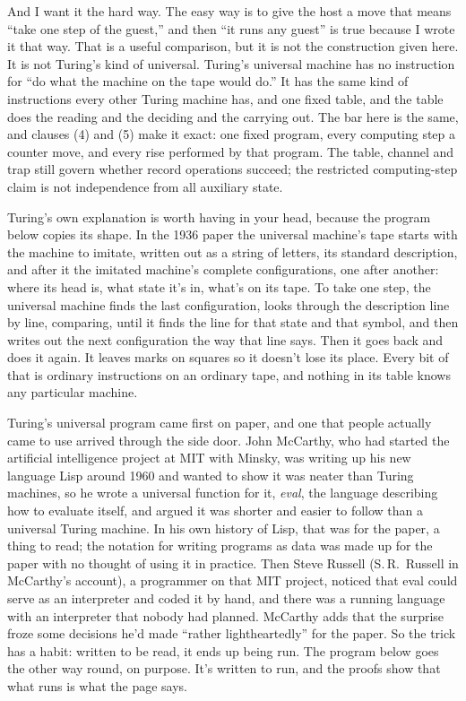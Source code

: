 \documentclass[11pt,twoside]{article}
\theoremstyle{thielethm}
\theoremstyle{thieledef}
\theoremstyle{thieledef}
\theoremstyle{thieledef}
\theoremstyle{thielethm}
\theoremstyle{thieleobs}
\theoremstyle{thielethm}
\begin{document}
And I want it the hard way. The easy way is to give the host a move that means ``take one step
of the guest,'' and then ``it runs any guest'' is true because I wrote it that way. That is a useful comparison, but it is not the construction given here.
It is not Turing's kind of universal. Turing's universal machine has no instruction for ``do what the machine on the tape
would do.'' It has the same kind of instructions every other Turing machine has, and one fixed
table, and the table does the reading and the deciding and the carrying out. The bar
here is the same, and clauses (4) and (5) make it exact: one fixed program, every computing step a counter
move, and every rise performed by that program. The table, channel and
trap still govern whether record operations succeed; the restricted
computing-step claim is not independence from all auxiliary state.

Turing's own explanation is worth having in your head, because the program below copies its
shape. In the 1936 paper the universal machine's tape starts with the machine to imitate, written
out as a string of letters, its standard description, and after it the imitated machine's
complete configurations, one after another: where its head is, what state it's in, what's on its
tape. To take one step, the universal machine finds the last configuration, looks through the
description line by line, comparing, until it finds the line for that state and that symbol, and
then writes out the next configuration the way that line says. Then it goes back and does it
again. It leaves marks on squares so it doesn't lose its place. Every bit of that is ordinary
instructions on an ordinary tape, and nothing in its table knows any particular machine.

Turing's universal program came first on paper, and one that
people actually came to use arrived through the side door. John McCarthy, who had started the artificial intelligence project at MIT
with Minsky, was writing up his new language Lisp around 1960 and wanted to
show it was neater than Turing machines, so he wrote a universal function for it, \emph{eval},
the language describing how to evaluate itself, and argued it was shorter and easier to follow
than a universal Turing machine. In his own history of Lisp, that was for the paper, a thing to
read; the notation for writing programs as data was made up for the paper with no thought of
using it in practice. Then Steve Russell (S.\,R.\ Russell in McCarthy's account), a programmer on
that MIT project, noticed that eval could serve as an
interpreter and coded it by hand, and there was a running language with an interpreter that
nobody had planned. McCarthy adds that the surprise froze some decisions he'd made ``rather
lightheartedly'' for the paper. So the trick has a habit: written to be read, it ends up being
run. The program below goes the other way round, on purpose. It's written to run, and the
proofs show that what runs is what the page says.
\end{document}

